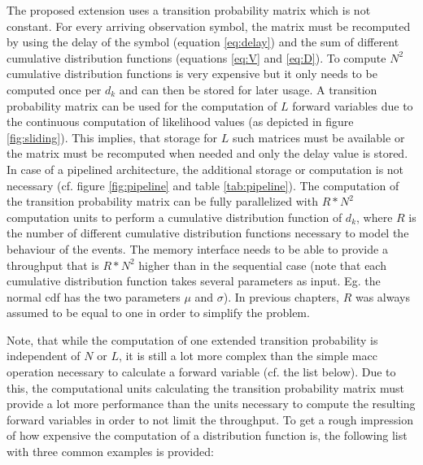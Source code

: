 \documentclass[mscthesis]{usiinfthesis}
\begin{document}
The proposed extension uses a transition probability matrix which is not
constant. For every arriving observation symbol, the matrix must be recomputed
by using the delay of the symbol (equation \ref{eq:delay}) and the sum of
different cumulative distribution functions (equations \ref{eq:V} and
\ref{eq:D}). To compute $N^2$ cumulative distribution functions is very
expensive but it only needs to be computed once per $d_k$ and can then be
stored for later usage.  A transition probability matrix can be used for the
computation of $L$ forward variables due to the continuous computation of
likelihood values (as depicted in figure \ref{fig:sliding}). This implies, that
storage for $L$ such matrices must be available or the matrix must be
recomputed when needed and only the delay value is stored. In case of
a pipelined architecture, the additional storage or computation is not
necessary (cf. figure \ref{fig:pipeline} and table \ref{tab:pipeline}). The
computation of the transition probability matrix can be fully parallelized with
$R*N^2$ computation units to perform a cumulative distribution function of
$d_k$, where $R$ is the number of different cumulative distribution functions
necessary to model the behaviour of the events. The memory interface needs to
be able to provide a throughput that is $R*N^2$ higher than in the sequential
case (note that each cumulative distribution function takes several parameters
as input. Eg. the normal \gls{cdf} has the two parameters $\mu$ and $\sigma$). In
previous chapters, $R$ was always assumed to be equal to one in order to
simplify the problem.

Note, that while the computation of one extended transition probability is
independent of $N$ or $L$, it is still a lot more complex than the simple
\gls{macc} operation necessary to calculate a forward variable (cf.
the list below). Due to this, the computational units calculating the
transition probability matrix must provide a lot more performance than the
units necessary to compute the resulting forward variables in order to not
limit the throughput. To get a rough impression of how expensive the
computation of a distribution function is, the following list with three common
examples is provided:
\end{document}

